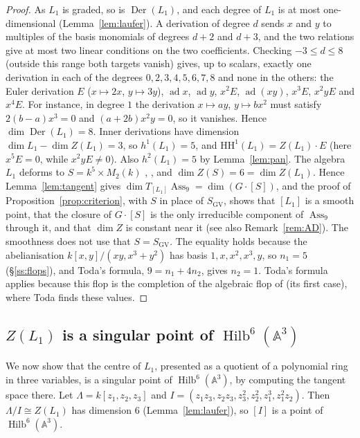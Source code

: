 \documentclass[11pt]{amsart}
\numberwithin{table}{section}
\numberwithin{figure}{section}
\numberwithin{equation}{section}
\theoremstyle{definition}
\theoremstyle{plain}
\newcommand{\SGV}{S_{\mathrm{GV}}}
\newcommand{\HH}{\mathrm{HH}}
\newcommand{\A}{\mathbb{A}}
\DeclareMathOperator{\Der}{Der}
\DeclareMathOperator{\Hilb}{Hilb}
\DeclareMathOperator{\Ass}{Ass}
\begin{document}
\begin{proof}
As $L_1$ is graded, so is $\Der(L_1)$, and each degree of $L_1$ is at most one-dimensional (Lemma~\ref{lem:laufer}). A derivation of degree $d$ sends $x$ and $y$ to multiples of the basis monomials of degrees $d + 2$ and $d + 3$, and the two relations give at most two linear conditions on the two coefficients. Checking $-3 \le d \le 8$ (outside this range both targets vanish) gives, up to scalars, exactly one derivation in each of the degrees $0, 2, 3, 4, 5, 6, 7, 8$ and none in the others: the Euler derivation $E$ ($x \mapsto 2x$, $y \mapsto 3y$), $\operatorname{ad} x$, $\operatorname{ad} y$, $x^2E$, $\operatorname{ad}(xy)$, $x^3E$, $x^2yE$ and $x^4E$. For instance, in degree $1$ the derivation $x \mapsto ay$, $y \mapsto bx^2$ must satisfy $2(b - a)x^3 = 0$ and $(a + 2b)x^2y = 0$, so it vanishes. Hence $\dim \Der(L_1) = 8$. Inner derivations have dimension $\dim L_1 - \dim Z(L_1) = 3$, so $h^1(L_1) = 5$, and $\HH^1(L_1) = Z(L_1)\cdot E$ (here $x^5E = 0$, while $x^2yE \neq 0$). Also $h^2(L_1) = 5$ by Lemma~\ref{lem:pan}. The algebra $L_1$ deforms to $S = k^5 \times M_2(k)$ \cite[Thm~4.2]{BPS}, \cite[Thm~3.13, Rem~3.4]{JS}, and $\dim Z(S) = 6 = \dim Z(L_1)$. Hence Lemma~\ref{lem:tangent} gives $\dim T_{[L_1]}\Ass_9 = \dim (G\cdot[S])$, and the proof of Proposition~\ref{prop:criterion}, with $S$ in place of $\SGV$, shows that $[L_1]$ is a smooth point, that the closure of $G\cdot[S]$ is the only irreducible component of $\Ass_9$ through it, and that $\dim Z$ is constant near it (see also Remark~\ref{rem:AD}). The smoothness does not use that $S = \SGV$. The equality holds because the abelianisation $k[x,y]/(xy, x^3 + y^2)$ has basis $1, x, x^2, x^3, y$, so $n_1 = 5$ (\S\ref{ss:flops}), and Toda's formula, $9 = n_1 + 4n_2$, gives $n_2 = 1$. Toda's formula applies because this flop is the completion of the algebraic flop of \cite[Example~1.3]{T} (its first case), where Toda finds these values.
\end{proof}

\subsection{\texorpdfstring{$Z(L_1)$ is a singular point of $\Hilb^6(\A^3)$}{Z(L1) is a singular point of Hilb6(A3)}}

We now show that the centre of $L_1$, presented as a quotient of a polynomial ring in three variables, is a singular point of $\Hilb^6(\A^3)$, by computing the tangent space there. Let $\Lambda = k[z_1,z_2,z_3]$ and $I = (z_1z_3,\allowbreak z_2z_3,\allowbreak z_3^2,\allowbreak z_2^2,\allowbreak z_1^3,\allowbreak z_1^2z_2)$. Then $\Lambda/I \cong Z(L_1)$ has dimension $6$ (Lemma~\ref{lem:laufer}), so $[I]$ is a point of $\Hilb^6(\A^3)$.
\end{document}
